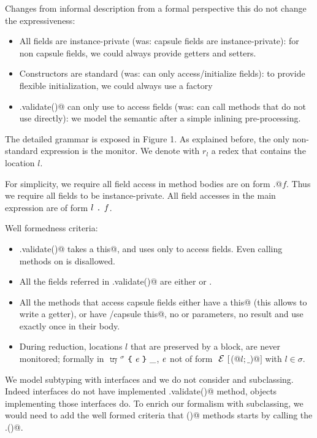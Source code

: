 Changes from informal description from a formal perspective this do not change the expressiveness:
\begin{itemize}
\item All fields are instance-private (was: capsule fields are instance-private):
for non capsule fields, we could always provide getters and setters.
\item Constructors are standard (was: can only access/initialize fields): to provide flexible initialization, we could always use a factory
\item \Q@.validate()@ can only use \Q@this@ to access fields (was: can call methods that do not use \Q@this@ directly):
we model the semantic after a simple inlining pre-processing.
\end{itemize}

The detailed grammar is exposed in Figure 1.
As explained before, the only non-standard expression is the monitor.
We denote with $r_l$ a redex that contains the location $l$.

For simplicity, we require all field access in method bodies are on form
\Q@this.@$f$. Thus we require all fields to be instance-private.
All field accesses in the main expression are of form $l{ \mbox{ {\texttt{.}} } }\mathit{f}$.

\noindent Well formedness criteria:
\begin{itemize}
\item \Q@.validate()@ takes a \Q@read this@, and uses \Q@this@ only to access fields. Even calling methods on \Q@this@
is disallowed.
\item All the fields referred in \Q@.validate()@ are either \Q@imm@ or \Q@capsule@.
\item All the methods that access capsule fields 
either have a \Q@read this@ (this allows to write a getter),
or have \Q@mut/capsule this@, no \Q@mut@ or \Q@read@ parameters, no \Q@mut@ result and 
use \Q@this@ exactly once in their body.
\item 
During reduction, locations $l$ that are preserved by a \Q@try@ block, are
never monitored; formally 
in $\Kw{try}^\sigma\oC\e\cC\_$, ${\mathit{e}}$ not of form $\ctx[$\Q@M(@$l;\_$\Q@)@$]$ with $l\in\sigma$.
\end{itemize}

We model subtyping with interfaces 
and we do not consider \Q@extends@ and subclassing.
Indeed interfaces do not have implemented \Q@.validate()@ method, objects implementing those interfaces do.
To enrich our formalism with subclassing, we would need to add the well 
formed criteria that \Q@validate()@ methods starts by calling the \Q@super@.\Q@validate()@.
\saveSpace
